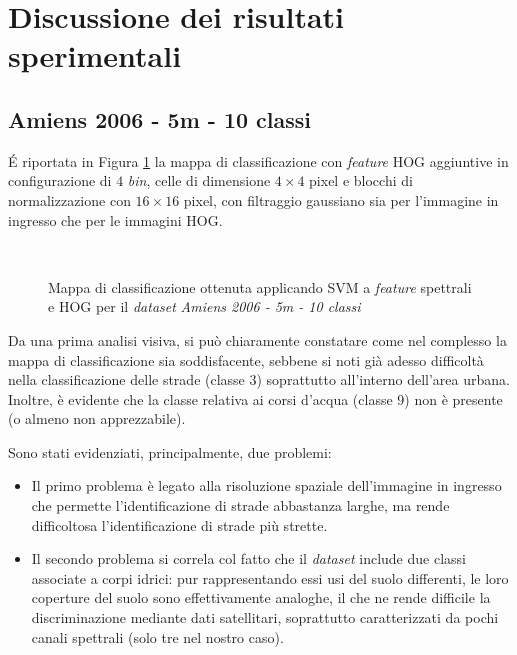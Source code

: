\clearpage

\section{Discussione dei risultati sperimentali}

\subsection{Amiens 2006 - 5m - 10 classi}

\'E riportata in Figura \ref{fig:ClassMap_Amiens2006_5m} la mappa di
classificazione con \emph{feature} HOG aggiuntive in configurazione di
$4$ \emph{bin}, celle di dimensione $4\times4$ pixel e blocchi di
normalizzazione con $16\times16$ pixel, con filtraggio gaussiano sia
per l'immagine in ingresso che per le immagini HOG.

\begin{figure}[!ht]
\center
{}
\\

\caption{Mappa di classificazione ottenuta applicando SVM a \emph{feature} spettrali e HOG per il \emph{dataset} \emph{Amiens 2006 - 5m - 10 classi}}

\label{fig:ClassMap_Amiens2006_5m}

\end{figure}
\clearpage
Da una prima analisi visiva, si può chiaramente constatare come nel
complesso la mappa di classificazione sia soddisfacente, sebbene si
noti già adesso difficoltà nella classificazione delle strade (classe
3) soprattutto all'interno dell'area urbana. Inoltre, è evidente che
la classe relativa ai corsi d'acqua (classe 9) non è presente (o
almeno non apprezzabile).

Sono stati evidenziati, principalmente, due problemi:
\begin{itemize}
\item Il primo problema è legato alla risoluzione spaziale dell'immagine in
ingresso che permette l'identificazione di strade abbastanza larghe, ma
rende difficoltosa l'identificazione di strade più strette.
\item Il secondo problema si correla col fatto che il \emph{dataset} include due classi
associate a corpi idrici: pur rappresentando essi usi del suolo
differenti, le loro coperture del suolo sono effettivamente analoghe,
il che ne rende difficile la discriminazione mediante dati
satellitari, soprattutto caratterizzati da pochi canali spettrali
(solo tre nel nostro caso).
\end{itemize}

